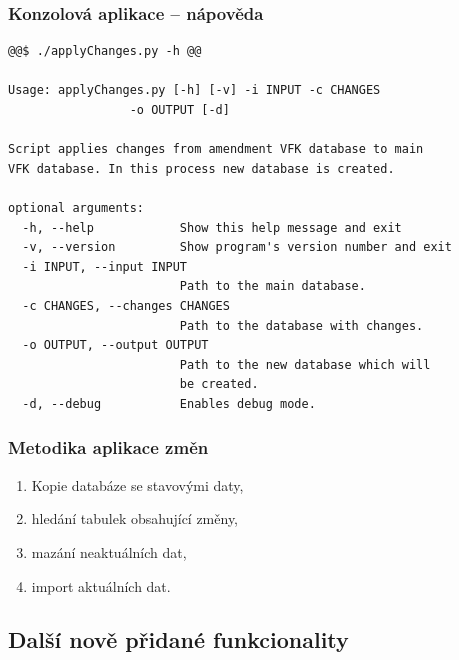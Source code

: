 \documentclass{beamer}
\begin{document}

\begin{frame}[fragile]
\frametitle{Konzolová aplikace -- nápověda}

\begin{scriptsize}
\begin{lstlisting}[moredelim={[is][keywordstyle]{@@}{@@}}]
@@$ ./applyChanges.py -h @@

Usage: applyChanges.py [-h] [-v] -i INPUT -c CHANGES 
				 -o OUTPUT [-d]

Script applies changes from amendment VFK database to main 
VFK database. In this process new database is created.

optional arguments:
  -h, --help            Show this help message and exit
  -v, --version         Show program's version number and exit
  -i INPUT, --input INPUT
                        Path to the main database.
  -c CHANGES, --changes CHANGES
                        Path to the database with changes.
  -o OUTPUT, --output OUTPUT
                        Path to the new database which will 
                        be created.
  -d, --debug           Enables debug mode.
\end{lstlisting}
\end{scriptsize}

\end{frame}


\begin{frame}
\frametitle{Metodika aplikace změn}

\begin{enumerate}
 \item Kopie databáze se stavovými daty,
 \item hledání tabulek obsahující změny,
 \item mazání neaktuálních dat,
 \item import aktuálních dat.
\end{enumerate}

\end{frame}


\subsection{Další nově přidané funkcionality}
\end{document}
